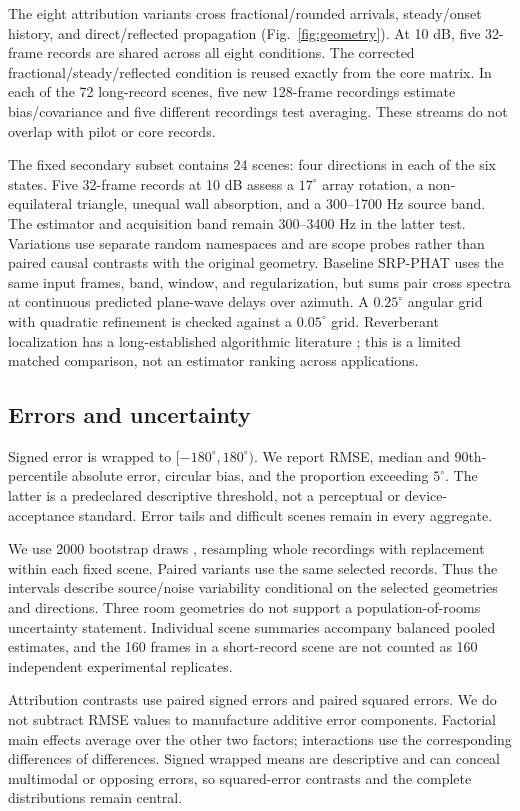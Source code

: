 \documentclass[10pt,a4paper,twocolumn]{article}
\begin{document}
The eight attribution variants cross fractional/rounded arrivals, steady/onset history, and direct/reflected propagation (Fig.~\ref{fig:geometry}). At 10 dB, five 32-frame records are shared across all eight conditions. The corrected fractional/steady/reflected condition is reused exactly from the core matrix. In each of the 72 long-record scenes, five new 128-frame recordings estimate bias/covariance and five different recordings test averaging. These streams do not overlap with pilot or core records.

The fixed secondary subset contains 24 scenes: four directions in each of the six states. Five 32-frame records at 10 dB assess a $17^\circ$ array rotation, a non-equilateral triangle, unequal wall absorption, and a 300--1700 Hz source band. The estimator and acquisition band remain 300--3400 Hz in the latter test. Variations use separate random namespaces and are scope probes rather than paired causal contrasts with the original geometry. Baseline SRP-PHAT uses the same input frames, band, window, and regularization, but sums pair cross spectra at continuous predicted plane-wave delays over azimuth. A $0.25^\circ$ angular grid with quadratic refinement is checked against a $0.05^\circ$ grid. Reverberant localization has a long-established algorithmic literature \citep{dibiase}; this is a limited matched comparison, not an estimator ranking across applications.

\subsection{Errors and uncertainty}
Signed error is wrapped to $[-180^\circ,180^\circ)$. We report RMSE, median and 90th-percentile absolute error, circular bias, and the proportion exceeding $5^\circ$. The latter is a predeclared descriptive threshold, not a perceptual or device-acceptance standard. Error tails and difficult scenes remain in every aggregate.

We use 2000 bootstrap draws \citep{efron}, resampling whole recordings with replacement within each fixed scene. Paired variants use the same selected records. Thus the intervals describe source/noise variability conditional on the selected geometries and directions. Three room geometries do not support a population-of-rooms uncertainty statement. Individual scene summaries accompany balanced pooled estimates, and the 160 frames in a short-record scene are not counted as 160 independent experimental replicates.

Attribution contrasts use paired signed errors and paired squared errors. We do not subtract RMSE values to manufacture additive error components. Factorial main effects average over the other two factors; interactions use the corresponding differences of differences. Signed wrapped means are descriptive and can conceal multimodal or opposing errors, so squared-error contrasts and the complete distributions remain central.
\end{document}
